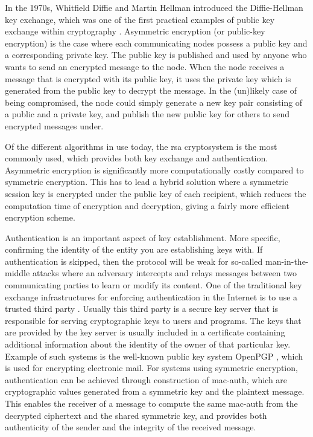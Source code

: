 In the 1970s, Whitfield Diffie and Martin Hellman introduced the Diffie-Hellman key exchange, which was one of the first practical examples of public key exchange within cryptography \cite{diffie1976new}.  Asymmetric encryption (or public-key encryption) is the case where each communicating nodes possess a public key and a corresponding private key. The public key is published and used by anyone who wants to send an encrypted message to the node. When the node receives a message that is encrypted with its public key, it uses the private key which is generated from the public key to decrypt the message. In the (un)likely case of being compromised, the node could simply generate a new key pair consisting of a public and a private key, and publish the new public key for others to send encrypted messages under.

Of the different algorithms in use today, the \gls{rsa} cryptosystem is the most commonly used, which provides both key exchange and authentication. Asymmetric encryption is significantly more computationally costly compared to symmetric encryption. This has to lead a hybrid solution where a symmetric session key is encrypted under the public key of each recipient, which reduces the computation time of encryption and decryption, giving a fairly more efficient encryption scheme.



Authentication is an important aspect of key establishment. More specific, confirming the identity of the entity you are establishing keys with. If authentication is skipped, then the protocol will be weak for so-called man-in-the-middle attacks where an adversary intercepts and relays messages between two communicating parties to learn or modify its content. One of the traditional key exchange infrastructures for enforcing authentication in the Internet is to use a trusted third party \cite{maurer1996modelling}. Usually this third party is a secure key server that is responsible for serving cryptographic keys to users and programs. The keys that are provided by the key server is usually included in a certificate containing additional information about the identity of the owner of that particular key. Example of such systems is the well-known public key system OpenPGP \cite{openpgp}, which is used for encrypting electronic mail. For systems using symmetric encryption, authentication can be achieved through construction of \gls{mac-auth}, which are cryptographic values generated from a symmetric key and the plaintext message. This enables the receiver of a message to compute the same \gls{mac-auth} from the decrypted ciphertext and the shared symmetric key, and provides both authenticity of the sender and the integrity of the received message.


